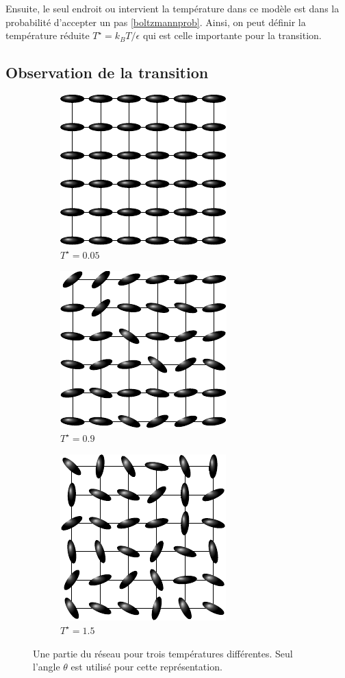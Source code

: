 \documentclass[11pt,a4paper]{article}
\numberwithin{equation}{section}
\begin{document}
Ensuite, le seul endroit ou intervient la température dans ce modèle est dans la probabilité d'accepter un pas \ref{boltzmannprob}. Ainsi, on peut définir la température réduite $T^\star = k_B T /\epsilon$ qui est celle importante pour la transition.

\subsection{Observation de la transition}
\begin{figure}[h!]
\center
    \begin{subfigure}[b]{0.30\textwidth}
    	\center
    	\includegraphics[scale=1]{figures/00.pdf}
    	\caption{$T^\star =0.05$}
    	\label{fonda}
    \end{subfigure}	
	\begin{subfigure}[b]{0.30\textwidth}
    	\center
    	\includegraphics[scale=1]{figures/09.pdf}
    	\caption{$T^\star =0.9$}
    	\label{09}
    \end{subfigure}
    \begin{subfigure}[b]{0.30\textwidth}
    	\center
    	\includegraphics[scale=1]{figures/15.pdf}
    	\caption{$T^\star =1.5$}
    	\label{15}
    \end{subfigure}	
    \caption{Une partie du réseau pour trois températures différentes. Seul l'angle $\theta$ est utilisé pour cette représentation. }
    \label{lattice}
\end{figure}
\end{document}

